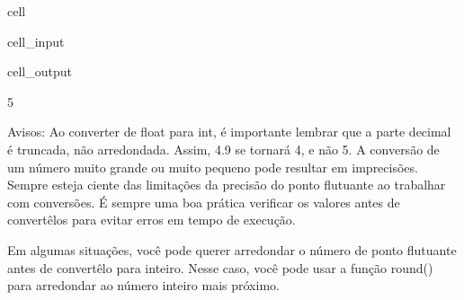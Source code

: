 \documentclass[letterpaper,10pt,english]{jupyterBook}
\begin{document}
\begin{sphinxuseclass}{cell}\begin{sphinxVerbatimInput}

\begin{sphinxuseclass}{cell_input}
\begin{sphinxVerbatim}[commandchars=\\\{\}]
  
  

\end{sphinxVerbatim}

\end{sphinxuseclass}\end{sphinxVerbatimInput}
\begin{sphinxVerbatimOutput}

\begin{sphinxuseclass}{cell_output}
\begin{sphinxVerbatim}[commandchars=\\\{\}]
5
\end{sphinxVerbatim}

\end{sphinxuseclass}\end{sphinxVerbatimOutput}

\end{sphinxuseclass}
\sphinxAtStartPar
Avisos:
Ao converter de float para int, é importante lembrar que a parte decimal é truncada, não arredondada. Assim, 4.9 se tornará 4, e não 5.
A conversão de um número muito grande ou muito pequeno pode resultar em imprecisões. Sempre esteja ciente das limitações da precisão do ponto flutuante ao trabalhar com conversões.
É sempre uma boa prática verificar os valores antes de convertê\sphinxhyphen{}los para evitar erros em tempo de execução.

\sphinxAtStartPar
Em algumas situações, você pode querer arredondar o número de ponto flutuante antes de convertê\sphinxhyphen{}lo para inteiro. Nesse caso, você pode usar a função round() para arredondar ao número inteiro mais próximo.
\end{document}
